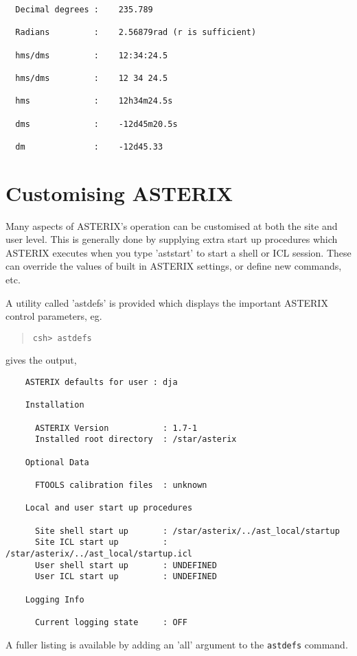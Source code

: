 \documentclass{book}
\renewcommand{\_}{{\tt\char'137}}     %
\begin{document}
\begin{verbatim}
  Decimal degrees :    235.789
 
  Radians         :    2.56879rad (r is sufficient)
 
  hms/dms         :    12:34:24.5
 
  hms/dms         :    12 34 24.5
 
  hms             :    12h34m24.5s
 
  dms             :    -12d45m20.5s
 
  dm              :    -12d45.33
\end{verbatim}
\section{Customising ASTERIX}
Many aspects of ASTERIX's operation can be customised at both the
site and user level. This is generally done by supplying extra
start up procedures which ASTERIX executes when you type 'aststart'
to start a shell or ICL session. These can override the values of
built in ASTERIX settings, or define new commands, etc.
 
A utility called 'astdefs' is provided which displays the important
ASTERIX control parameters, eg.
 
\begin{quote}\begin{verbatim}
csh> astdefs
\end{verbatim}\end{quote}
gives the output,
\begin{verbatim}
    ASTERIX defaults for user : dja
 
    Installation
 
      ASTERIX Version           : 1.7-1
      Installed root directory  : /star/asterix
 
    Optional Data
 
      FTOOLS calibration files  : unknown
 
    Local and user start up procedures
 
      Site shell start up       : /star/asterix/../ast_local/startup
      Site ICL start up         : /star/asterix/../ast_local/startup.icl
      User shell start up       : UNDEFINED
      User ICL start up         : UNDEFINED
 
    Logging Info
 
      Current logging state     : OFF
    \end{verbatim}
A fuller listing is available by adding an 'all' argument to the
{\tt astdefs} command.
 
\end{document}
